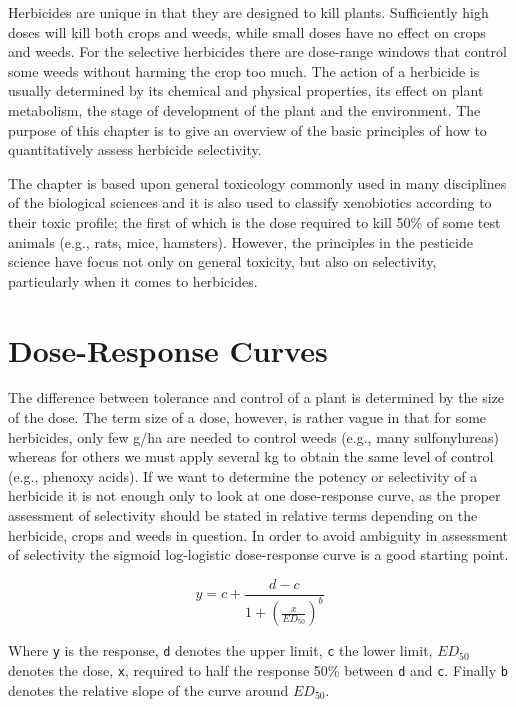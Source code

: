 \documentclass[letterpaper,]{book}
\begin{document}
Herbicides are unique in that they are designed to kill plants. Sufficiently high doses will kill both crops and weeds, while small doses have no effect on crops and weeds. For the selective herbicides there are dose-range windows that control some weeds without harming the crop too much. The action of a herbicide is usually determined by its chemical and physical properties, its effect on plant metabolism, the stage of development of the plant and the environment. The purpose of this chapter is to give an overview of the basic principles of how to quantitatively assess herbicide selectivity.

The chapter is based upon general toxicology commonly used in many disciplines of the biological sciences and it is also used to classify xenobiotics according to their toxic profile; the first of which is the dose required to kill 50\% of some test animals (e.g., rats, mice, hamsters). However, the principles in the pesticide science have focus not only on general toxicity, but also on selectivity, particularly when it comes to herbicides.

\hypertarget{dose-response-curves-1}{%
\section{Dose-Response Curves}\label{dose-response-curves-1}}

The difference between tolerance and control of a plant is determined by the size of the dose. The term size of a dose, however, is rather vague in that for some herbicides, only few g/ha are needed to control weeds (e.g., many sulfonylureas) whereas for others we must apply several kg to obtain the same level of control (e.g., phenoxy acids). If we want to determine the potency or selectivity of a herbicide it is not enough only to look at one dose-response curve, as the proper assessment of selectivity should be stated in relative terms depending on the herbicide, crops and weeds in question. In order to avoid ambiguity in assessment of selectivity the sigmoid log-logistic dose-response curve is a good starting point.

\[y=c+\frac{d-c}{1+ \left(\frac{x}{ED_{50}}\right)^b} \]

Where \texttt{y} is the response, \texttt{d}
denotes the upper limit, \texttt{c} the lower limit, \(ED_{50}\) denotes the dose,
\texttt{x}, required to half the response 50\% between \texttt{d} and \texttt{c}. Finally \texttt{b} denotes the relative slope of the curve around \(ED_{50}\).
\end{document}
